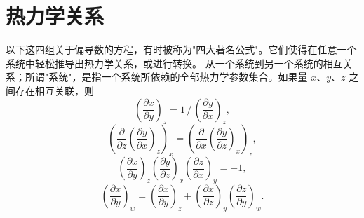 \section{热力学关系}\label{h-ux70edux529bux5b66ux5173ux7cfb}
以下这四组关于偏导数的方程，有时被称为"四大著名公式"。它们使得在任意一个系统中轻松推导出热力学关系，或进行转换。
从一个系统到另一个系统的相互关系；所谓"系统"，是指一个系统所依赖的全部热力学参数集合。如果量 \(x\)、\(y\)、\(z\) 之间存在相互关联，则
\begin{equation}\tag{17.8.1}\label{eq:17.8.1}
\left( \frac { \partial x } { \partial y } \right) _ { z } = 1 \, \Big / \, \left( \frac { \partial y } { \partial x } \right) _ { z } ,
\end{equation}
\begin{equation}\tag{17.8.2}\label{eq:17.8.2}
\left( \frac { \partial } { \partial z } \left( \frac { \partial y } { \partial x } \right) _ { z } \right) _ { x } = \left( \frac { \partial } { \partial x } \left( \frac { \partial y } { \partial z } \right) _ { x } \right) _ { z } ,
\end{equation}
\begin{equation}\tag{17.8.3}\label{eq:17.8.3}
\left( { \frac { \partial x } { \partial y } } \right) _ { z } \left( { \frac { \partial y } { \partial z } } \right) _ { x } \left( { \frac { \partial z } { \partial x } } \right) _ { y } = - 1 ,
\end{equation}
\begin{equation}\tag{17.8.4}\label{eq:17.8.4}
\left( \frac { \partial x } { \partial y } \right) _ { w } = \left( \frac { \partial x } { \partial y } \right) _ { z } + \left( \frac { \partial x } { \partial z } \right) _ { y } \left( \frac { \partial z } { \partial y } \right) _ { w } .
\end{equation}
